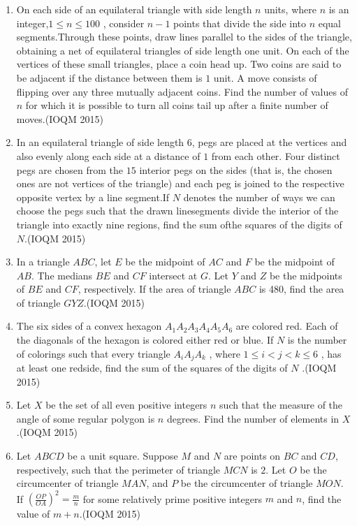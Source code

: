 \begin{enumerate}

	\item On each side of an equilateral triangle with side length $n$ units, where $n$ is an integer,$1 \leq n \leq 100$ , consider $n - 1$ points that divide the side into $n$ equal segments.Through these points, draw lines parallel to the sides of the triangle, obtaining a net of equilateral triangles of side length one unit. On each of the vertices of these small triangles, place a coin head up. Two coins are said to be adjacent if the distance between them is $1$ unit. A move consists of flipping over any three mutually adjacent coins. Find the number of values of $n$ for which it is possible to turn all coins tail up after a finite number of moves.\hfill(IOQM 2015)


	\item In an equilateral triangle of side length $6$, pegs are placed at the vertices and also evenly along each side at a distance of $1$ from each other. Four distinct pegs are chosen from the $15$ interior pegs on the sides (that is, the chosen ones are not vertices of the triangle) and each peg is joined to the respective opposite vertex by a line segment.If $N$ denotes the number of ways we can choose the pegs such that the drawn linesegments divide the interior of the triangle into exactly nine regions, find the sum ofthe squares of the digits of $N$.\hfill(IOQM 2015)		
	\item In a triangle $ABC$, let $E$ be the midpoint of $AC$ and $F$ be the midpoint of $AB$. The medians $BE$ and $CF$ intersect at $G$. Let $Y$ and $Z$ be the midpoints of $BE$ and $CF$, respectively. If the area of triangle $ABC$ is 480, find the area of triangle $GYZ$.\hfill(IOQM 2015)
	    \item The six sides of a convex hexagon $A_{1}A_{2}A_{3}A_{4}A_{5}A_{6}$ are colored red. Each of the diagonals of the hexagon is colored either red or blue. If $N$ is the number of colorings such that every triangle $A_{i}A_{j}A_{k}$ , where $1 \leq i < j < k \leq 6$ , has at least one redside, find the sum of the squares of the digits of $N$ .\hfill(IOQM 2015)
    \item Let $X$ be the set of all even positive integers $n$ such that the measure of the angle of some regular polygon is $n$ degrees. Find the number of elements in $X$ .\hfill(IOQM 2015)
    
    \item Let $ABCD$ be a unit square. Suppose $M$ and $N$ are points on $BC$ and $CD$, respectively, such that the perimeter of triangle $MCN$ is $2$. Let $O$ be the circumcenter of triangle $MAN$, and $P$ be the circumcenter of triangle $MON$. If $\left(\frac{OP}{OA}\right)^2 = \frac{m}{n}$ for some relatively prime positive integers $m$ and $n$, find the value of $m + n$.\hfill(IOQM 2015)
    

\end{enumerate}
